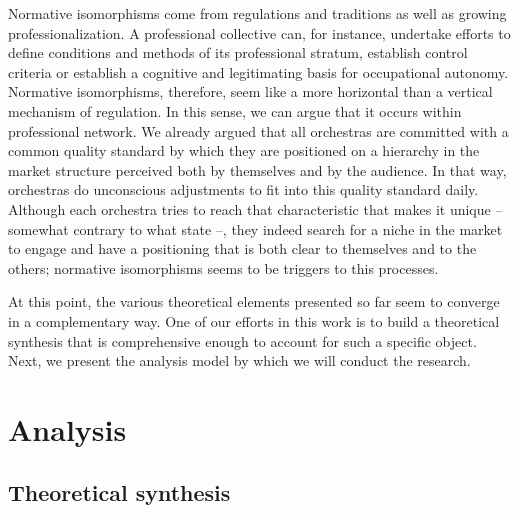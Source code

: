 \documentclass[a4paper, 12pt, openright, oneside, german, french, brazil, english]{abntex2}
\begin{document}
	Normative isomorphisms come from regulations and traditions as well as growing professionalization. A professional collective can, for instance, undertake efforts to define conditions and methods of its professional stratum, establish control criteria or establish a cognitive and legitimating basis for occupational autonomy. Normative isomorphisms, therefore, seem like a more horizontal than a vertical mechanism of regulation. In this sense, we can argue that it occurs within professional network. We already argued that all orchestras are committed with a common quality standard by which they are positioned on a hierarchy in the market structure perceived both by themselves and by the audience. In that way, orchestras do unconscious adjustments to fit into this quality standard daily. Although each orchestra tries to reach that characteristic that makes it unique -- somewhat contrary to what  state --, they indeed search for a niche in the market to engage and have a positioning that is both clear to themselves and to the others; normative isomorphisms seems to be triggers to this processes.
	
	
	
	At this point, the various theoretical elements presented so far seem to converge in a complementary way. One of our efforts in this work is to build a theoretical synthesis that is comprehensive enough to account for such a specific object. Next, we present the analysis model by which we will conduct the research.

	
	\section{Analysis}
	
	\subsection{Theoretical synthesis}
\end{document}

